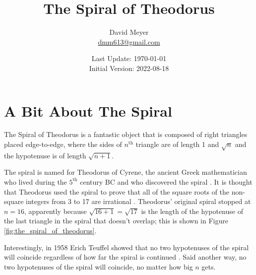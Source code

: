\documentclass{article}
\title{The Spiral of Theodorus}
\author{David Meyer \\ \href{mailto:dmm613@gmail.com}
                            {dmm613@gmail.com}}
\date{Last Update: \today \\
	 {\vspace{1.00mm} \small Initial Version: 2022-08-18}}
\theoremstyle{definition}
\begin{document}
\maketitle
%
%
%
\section{A Bit About The Spiral}
\label{sec:spiral_of_theodorus}
The Spiral of Theodorus is a 
fantastic object that is composed of right
triangles placed edge-to-edge, where the sides of $n^{\text{th}}$
triangle are of length 1 and $\sqrt{n}$ and the hypotenuse is of
length $\sqrt{n+1}$.

\bigskip
\noindent
The spiral is named for Theodorus of Cyrene, the ancient Greek
mathematician who lived during the $5^{\text{th}}$ century BC and
who discovered the spiral \cite{wiki:theodorus_of_cyrene}. It is
thought that Theodorus used the spiral to prove that all of the 
square roots of the non-square integers from 3 to 17 are irrational 
\cite{wiki:spiral_of_theodorus}. Theodorus' original spiral stopped 
at $n = 16$, apparently because $\sqrt{16+1} = \sqrt{17}$ is the 
length of the hypotenuse of the last triangle in the spiral that
doesn't overlap; this is shown in Figure \ref{fig:the_spiral_of_theodorus}.

\bigskip
\noindent
Interestingly, in 1958 Erich Teuffel showed that no two hypotenuses
of the spiral will coincide regardless of how far the spiral
is continued \cite{wurzelschnecke}. Said another way, no two
hypotenuses of the spiral will coincide, no matter how big $n$
gets.
\end{document}
